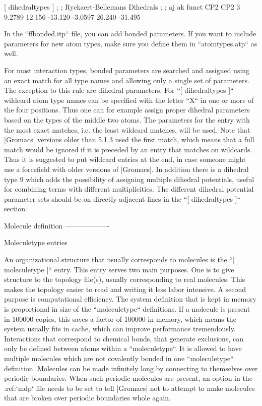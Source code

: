     [ dihedraltypes ]
    ;
    ; Ryckaert-Bellemans Dihedrals
    ;
    ; aj    ak      funct
    CP2     CP2     3       9.2789  12.156  -13.120 -3.0597 26.240  -31.495

In the ``ffbonded.itp`` file, you can add bonded parameters.
If you want to include parameters for new atom types, make sure you
define them in ``atomtypes.atp`` as well.

For most interaction types, bonded parameters are searched and assigned
using an exact match for all type names and allowing only a single set
of parameters. The exception to this rule are
dihedral
parameters. For
``[ dihedraltypes ]`` wildcard atom type names can be
specified with the letter ``X`` in one or more of the four
positions. Thus one can for example assign proper dihedral parameters
based on the types of the middle two atoms. The parameters for the entry
with the most exact matches, i.e. the least wildcard matches, will be
used. Note that |Gromacs| versions older than 5.1.3 used the first match,
which means that a full match would be ignored if it is preceded by an
entry that matches on wildcards. Thus it is suggested to put wildcard
entries at the end, in case someone might use a forcefield with older
versions of |Gromacs|. In addition there is a dihedral type 9 which adds
the possibility of assigning multiple dihedral potentials, useful for
combining terms with different multiplicities. The different dihedral
potential parameter sets should be on directly adjacent lines in the
``[ dihedraltypes ]`` section.

Molecule definition
-------------------

Moleculetype entries
~~~~~~~~~~~~~~~~~~~~

An organizational structure that usually corresponds to molecules is the
``[ moleculetype ]`` entry. This entry serves two main
purposes. One is to give structure to the topology file(s), usually
corresponding to real molecules. This makes the topology easier to read
and writing it less labor intensive. A second purpose is computational
efficiency. The system definition that is kept in memory is proportional
in size of the ``moleculetype`` definitions. If a molecule
is present in 100000 copies, this saves a factor of 100000 in memory,
which means the system usually fits in cache, which can improve
performance tremendously. Interactions that correspond to chemical
bonds, that generate exclusions, can only be defined between atoms
within a ``moleculetype``. It is allowed to have multiple
molecules which are not covalently bonded in one
``moleculetype`` definition. Molecules can be made
infinitely long by connecting to themselves over periodic boundaries.
When such periodic molecules are present, an option in the
:ref:`mdp` file needs to be set to tell |Gromacs| not to attempt
to make molecules that are broken over periodic boundaries whole again.

